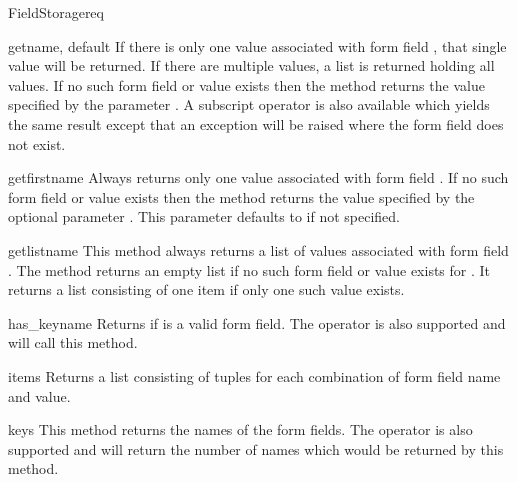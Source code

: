 \begin{classdesc}{FieldStorage}{req}
  \begin{methoddesc}[FieldStorage]{get}{name, default}
    If there is only one value associated with form field , that
    single value will be returned. If there are multiple values, a list is
    returned holding all values. If no such form field or value exists then
    the method returns the value specified by the parameter .
    A subscript operator is also available which yields the same result
    except that an exception will be raised where the form field 
    does not exist.
  \end{methoddesc}

  \begin{methoddesc}[FieldStorage]{getfirst}{name}
    Always returns only one value associated with form field
    . If no such form field or value exists then the method
    returns the value specified by the optional parameter
    . This parameter defaults to  if not
    specified.
  \end{methoddesc}

  \begin{methoddesc}[FieldStorage]{getlist}{name}
    This method always returns a list of values associated with form
    field . The method returns an empty list if no such form
    field or value exists for . It returns a list consisting
    of one item if only one such value exists.
  \end{methoddesc}

  \begin{methoddesc}[FieldStorage]{has_key}{name}
    Returns  if  is a valid form field. The 
    operator is also supported and will call this method.
  \end{methoddesc}

  \begin{methoddesc}[FieldStorage]{items}{}
    Returns a list consisting of tuples for each combination of form
    field name and value.
  \end{methoddesc}

  \begin{methoddesc}[FieldStorage]{keys}{}
    This method returns the names of the form fields. The 
    operator is also supported and will return the number of names
    which would be returned by this method.
  \end{methoddesc}

\end{classdesc}

